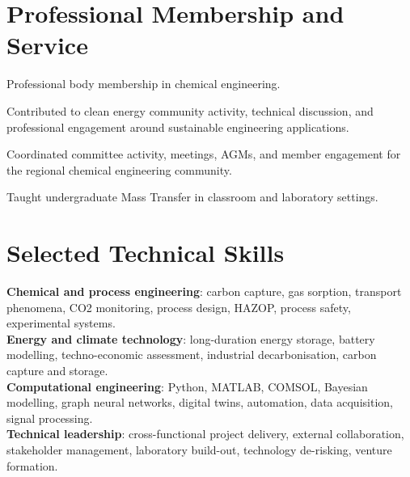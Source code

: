 \documentclass{../../templates/karthicv-single}
\begin{document}
\section{Professional Membership and Service}

{Professional body membership in chemical engineering.}

{Contributed to clean energy community activity, technical discussion, and professional engagement around sustainable engineering applications.}

{Coordinated committee activity, meetings, AGMs, and member engagement for the regional chemical engineering community.}

{Taught undergraduate Mass Transfer in classroom and laboratory settings.}

\section{Selected Technical Skills}

\textbf{Chemical and process engineering}: carbon capture, gas sorption, transport phenomena, CO2 monitoring, process design, HAZOP, process safety, experimental systems.\\
\textbf{Energy and climate technology}: long-duration energy storage, battery modelling, techno-economic assessment, industrial decarbonisation, carbon capture and storage.\\
\textbf{Computational engineering}: Python, MATLAB, COMSOL, Bayesian modelling, graph neural networks, digital twins, automation, data acquisition, signal processing.\\
\textbf{Technical leadership}: cross-functional project delivery, external collaboration, stakeholder management, laboratory build-out, technology de-risking, venture formation.
\end{document}
